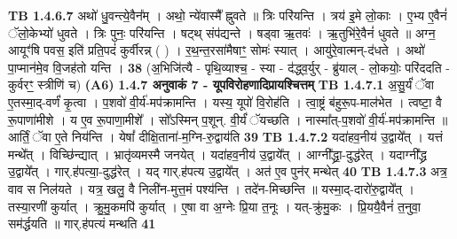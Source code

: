 \documentclass[17pt]{extarticle}
\begin{document}
                  \newline
                                \textbf{ TB 1.4.6.7} \newline
                  अथो॑ धु॒वन्त्ये॒वैन᳚म् । अथो॒ न्ये॑वास्मै᳚ ह्नुवते ॥ त्रिः परि॑यन्ति । त्रय॑ इ॒मे लो॒काः । ए॒भ्य ए॒वैनं॑ ॅलो॒केभ्यो॑ धुवते । त्रिः पुनः॒ परि॑यन्ति । षट्थ् संप॑द्यन्ते । षड्वा ऋ॒तवः॑ । ऋ॒तुभि॑रे॒वैनं॑ धुवते ॥ अग्न॒ आयूꣳ॑षि पवस॒ इति॑ प्रति॒पदं॑ कुर्वीरन्न् ( ) । र॒थ॒न्त॒रसा॑मैषाꣳ॒॒ सोमः॑ स्यात् । आयु॑रे॒वात्मन्-द॑धते । अथो॑ पा॒प्मान॑मे॒व वि॒जह॑तो यन्ति । \textbf{ 38} \newline
                  \newline
                                    (अ॒भिजि॑त्यै - पृथि॒व्याश्च॒ - स्या - द॑द्ध्व॒र्युर् - ब्रु॑याल् - लो॒कयोः॒ परि॑ददति - कुर्वरꣳ॒॒ स्त्रीणि॑ च) \textbf{(A6)} \newline \newline
                \textbf{ 1.4.7     अनुवाकं   7 - यूपविरोहणादिप्रायश्चित्तम्} \newline
                                \textbf{ TB 1.4.7.1} \newline
                  अ॒सु॒र्यं॑ ॅवा ए॒तस्मा॒द्-वर्णं॑ कृ॒त्वा । प॒शवो॑ वी॒र्य॑-मप॑क्रामन्ति । यस्य॒ यूपो॑ वि॒रोह॑ति । त्वा॒ष्ट्रं ब॑हुरू॒प-माल॑भेत । त्वष्टा॒ वै रू॒पाणा॑मीशे । य ए॒व रू॒पाणा॒मीशे᳚ । सो᳚ऽस्मिन् प॒शून्. वी॒र्यं॑ ॅयच्छति । नास्मा᳚त्-प॒शवो॑ वी॒र्य॑-मप॑क्रामन्ति ॥ आर्तिं॒ ॅवा ए॒ते निय॑न्ति । येषां᳚ दीक्षि॒ताना॑-म॒ग्नि-रु॒द्वाय॑ति \textbf{ 39} \newline
                  \newline
                                \textbf{ TB 1.4.7.2} \newline
                  यदा॑हव॒नीय॑ उ॒द्वाये᳚त् । यत्तं मन्थे᳚त् । विच्छि॑न्द्यात् । भ्रातृ॑व्यमस्मै जनयेत् । यदा॑हव॒नीय॑ उ॒द्वाये᳚त् । आग्नी᳚द्ध्रा॒-दुद्ध॑रेत् । यदाग्नी᳚द्ध्र उ॒द्वाये᳚त् । गार्.ह॑पत्या॒-दुद्ध॑रेत् । यद् गार्.ह॑पत्य उ॒द्वाये᳚त् । अत॑ ए॒व पुन॑र् मन्थेत् \textbf{ 40} \newline
                  \newline
                                \textbf{ TB 1.4.7.3} \newline
                  अत्र॒ वाव स निल॑यते । यत्र॒ खलु॒ वै निली॑न-मुत्त॒मं पश्य॑न्ति । तदे॑न-मिच्छन्ति ॥ यस्मा॒द्-दारो॑रु॒द्वाये᳚त् । तस्या॒रणी॑ कुर्यात् । क्रु॒मु॒कमपि॑ कुर्यात् । ए॒षा वा अ॒ग्नेः प्रि॒या त॒नूः । यत्-क्रु॑मु॒कः । प्रि॒ययै॒वैनं॑ त॒नुवा॒ सम॑र्द्धयति ॥ गार्.ह॑पत्यं मन्थति \textbf{ 41} \newline
                  \newline
\end{document}
